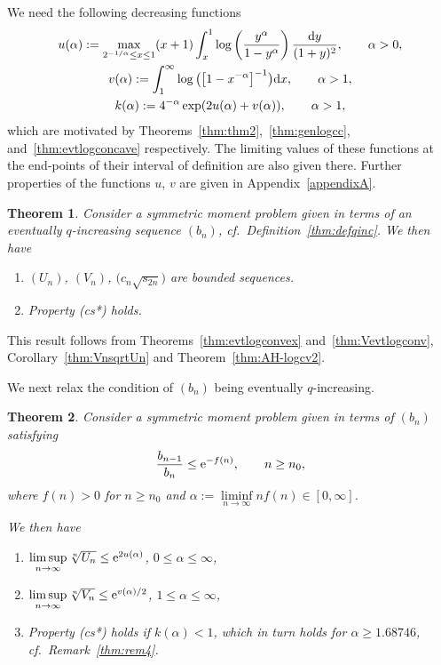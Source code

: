 \documentclass[pdftex]{sigma}
\numberwithin{equation}{section}
\newtheorem{thm}{Theorem}[section]
\begin{document}
We need the following decreasing functions
\begin{gather}\label{eq:ua}
u(\alpha):=\max_{2^{-1/\alpha}\le x\le 1} (x+1)\int_x^1\log\left(\frac{y^\alpha}{1-y^\alpha}\right)\frac{{\rm d}y}{(1+y)^2},\qquad \alpha>0, \\
\label{eq:va}
v(\alpha):=\int_1^\infty \log\big(\big[1-x^{-\alpha}\big]^{-1}\big){\rm d}x,\qquad \alpha>1, \\
\label{eq:ka}
k(\alpha):=4^{-\alpha}\exp(2u(\alpha)+v(\alpha)),\qquad \alpha>1,
\end{gather}
which are motivated by Theorems~\ref{thm:thm2},~\ref{thm:genlogcc}, and~\ref{thm:evtlogconcave} respectively. The limiting values of these functions at the end-points of their interval of definition are also given there. Further properties of the functions $u$, $v$ are given in Appendix~\ref{appendixA}.


\begin{thm}\label{thm:Main3} Consider a symmetric moment problem given in terms of an eventually $q$-increasing sequence $(b_n)$, cf.\ Definition~{\rm \ref{thm:defqinc}}. We then have
\begin{enumerate}\itemsep=0pt
\item[$(i)$] $(U_n)$, $(V_n)$, $\big(c_n\sqrt{s_{2n}}\big)$ are bounded sequences.
\item[$(ii)$] Property {\rm (cs*)} holds.
\end{enumerate}
\end{thm}

This result follows from Theorems~\ref{thm:evtlogconvex} and~\ref{thm:Vevtlogconv}, Corollary~\ref{thm:VnsqrtUn} and Theorem~\ref{thm:AH-logcv2}.

We next relax the condition of $(b_n)$ being eventually $q$-increasing.

\begin{thm}\label{thm:Main4} Consider a symmetric moment problem given in terms of $(b_n)$ satisfying
\begin{gather*}
\frac{b_{n-1}}{b_n}\le {\rm e}^{-f(n)},\qquad n\ge n_0,
\end{gather*}
where $f(n)>0$ for $n\ge n_0$ and $\alpha:=\liminf\limits_{n\to\infty} nf(n)\in [0,\infty]$.

We then have
\begin{enumerate}\itemsep=0pt
\item[$(i)$] $\limsup\limits_{n\to\infty}\root{n}\of{U_n}\le {\rm e}^{2u(\alpha)}$, $0\le \alpha\le\infty$,
\item[$(ii)$] $\limsup\limits_{n\to\infty}\root{n}\of{V_n}\le {\rm e}^{v(\alpha)/2}$, $1\le \alpha\le\infty$,
\item[$(iii)$] Property {\rm (cs*)} holds if $k(\alpha)<1$, which in turn holds for $\alpha\ge 1.68746$, cf.\ Remark~{\rm \ref{thm:rem4}}.
\end{enumerate}
\end{thm}
\end{document}
